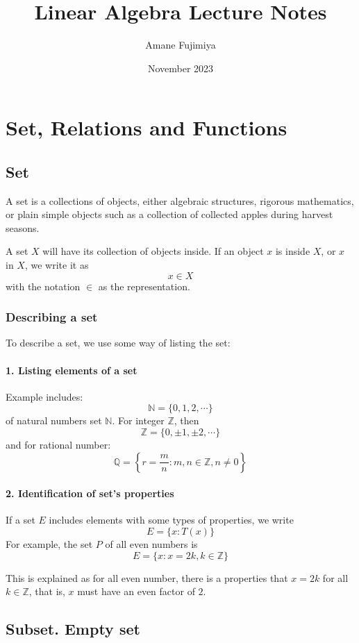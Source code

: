 \documentclass{book}
\title{Linear Algebra Lecture Notes}
\author{Amane Fujimiya}
\date{November 2023}
\numberwithin{identity}{subsection}
\numberwithin{Rule}{subsection}
\numberwithin{Theorem}{subsection}
\numberwithin{Definition}{subsection}
\begin{document}
\maketitle

\chapter{ Set, Relations and Functions}
\section{ Set} 
A set is a collections of objects, either algebraic structures, rigorous mathematics, or plain simple objects such as a collection of collected apples during harvest seasons. 

A set $X$ will have its collection of objects inside. If an object $x$ is inside $X$, or $x$ in $X$, we write it as $$x \in X$$
with the notation $\in$ as the representation.
\subsection{Describing a set} 
To describe a set, we use some way of listing the set: 
\subsubsection{1. Listing elements of a set} 
Example includes: 
$$\mathbb{N}=\{0,1,2,\cdots\}$$
of natural numbers set $\mathbb{N}$. For integer $\mathbb{Z}$, then $$\mathbb{Z}=\{0,\pm1,\pm2,\cdots\}$$
and for rational number: $$\mathbb{Q}=\left\{r= \frac{m}{n}:m,n\in \mathbb{Z},n \neq 0 \right\}$$

\subsubsection{2. Identification of set's properties}

If a set $E$ includes elements with some types of properties, we write $$E=\{x:T(x)\}$$
For example, the set $P$ of all even numbers is $$E=\{x:x=2k,k\in \mathbb{Z}\}$$

This is explained as for all even number, there is a properties that $x=2k$ for all $k\in \mathbb{Z}$, that is, $x$ must have an even factor of $2$. 

\section{Subset. Empty set}
\end{document}
